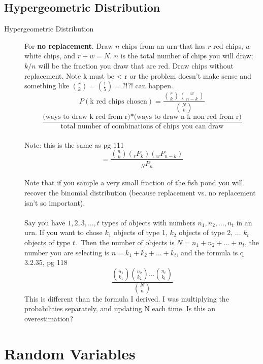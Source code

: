 \subsection{Hypergeometric Distribution}
	\begin{description}
		\item[Hypergeometric Distribution]  For \textbf{no replacement}.  Draw $n$ chips from an urn that has $r$ red chips, $w$ white chips, and $r + w = N$.   $n$ is the total number of chips you will draw; $k/n$ will be the fraction you draw that are red. Draw chips without replacement.  Note k must be < r or the problem doesn't make sense and something like ${{r} \choose {k}} = {{1} \choose {5}} = ?!?!$ can happen.  
			\[ P(\mbox{k red chips chosen}) = \frac{ {{r} \choose {k}} {{w} \choose {n-k}} }{{{N}\choose{k}}} \] %
			\[ \frac{\mbox{(ways to draw \ k red from r)}*\mbox{(ways to draw n-k non-red from r)}}{\mbox{total number of combinations of chips you can draw}} \] \hfill \\
		Note: this is the same as	{\tiny pg 111}
		\[ = \frac{ {{n} \choose {k}} ({{_r}P_{k}}) ({{_w}P_{n-k}}) }{{{_N}P_n}} \] 
			\hfill \\
		Note that if you sample a very small fraction of the fish pond you will recover the binomial distribution (because replacement vs. no replacement isn't so important). \hfill \\
		\hfill \\
		Say you have $1, 2, 3, \dots, t$ types of objects with numbers $n_1, n_2, \dots, n_t$ in an urn.
		If you want to chose $k_1$ objects of  type 1, $k_2$ objects of  type 2, $\dots$ $k_t$ objects of  type $t$.\
		Then the number of objects is $N = n_1 + n_2 + \dots + n_t$, the number you are selecting is $n = k_1+ k_2 + \dots + k_t$, and  the formula is   {\tiny q 3.2.35, pg 118}
		\[  \frac{ {{n_1}\choose{k_1}} {{n_2}\choose{k_2}} \dots {{n_t}\choose{k_t}} }{ {{N}\choose{n}} }  \]
		This is different than the formula I derived.  I was multiplying the probabilities separately, and updating N each time.  Is this an overestimation? 		
	\end{description}
	
\section{Random Variables} 


